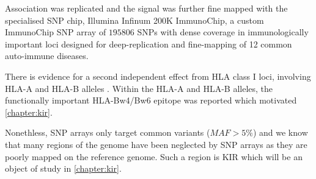 
Association was replicated and the signal was further fine mapped with the specialised SNP chip, Illumina Infinum 200K ImmunoChip, a custom ImmunoChip SNP array
of $195806$ SNPs with dense coverage in immunologically important loci designed for deep-replication and fine-mapping of 12 common auto-immune diseases.

There is evidence for a second independent effect from HLA class I loci,
involving HLA-A and HLA-B alleles \citep{Todd:2010bl}.
Within the HLA-A and HLA-B alleles,
the functionally important HLA-Bw4/Bw6 epitope \citep{Nejentsev:2007dv} was reported which motivated \cref{chapter:kir}.

Nonethless, SNP arrays only target common variants ($MAF > 5\%$) and
we know that many regions of the genome have been neglected by SNP arrays as they are poorly mapped on the reference genome.
Such a region is KIR which will be an object of study in \cref{chapter:kir}.







